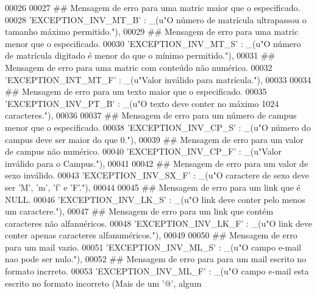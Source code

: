 \begin{DoxyCode}
00026 
00027     \textcolor{comment}{## Mensagem de erro para uma matric maior que o especificado.}
00028     \textcolor{stringliteral}{'EXCEPTION\_INV\_MT\_B'} : \_(\textcolor{stringliteral}{u"O número de matrícula ultrapassou o tamanho máximo permitido."}),
00029     \textcolor{comment}{## Mensagem de erro para uma matric menor que o especificado.}
00030     \textcolor{stringliteral}{'EXCEPTION\_INV\_MT\_S'} : \_(\textcolor{stringliteral}{u"O número de matrícula digitado é menor do que o mínimo permitido."}),
00031     \textcolor{comment}{## Mensagem de erro para uma matric com conteúdo não numérico.}
00032     \textcolor{stringliteral}{'EXCEPTION\_INT\_MT\_F'} : \_(\textcolor{stringliteral}{u"Valor inválido para matrícula."}),
00033 
00034     \textcolor{comment}{## Mensagem de erro para um texto maior que o especificado.}
00035     \textcolor{stringliteral}{'EXCEPTION\_INV\_PT\_B'} : \_(\textcolor{stringliteral}{u"O texto deve conter no máximo 1024 caracteres."}),
00036 
00037     \textcolor{comment}{## Mensagem de erro para um número de campus menor que o especificado.}
00038     \textcolor{stringliteral}{'EXCEPTION\_INV\_CP\_S'} : \_(\textcolor{stringliteral}{u"O número do campus deve ser maior do que 0."}),
00039     \textcolor{comment}{## Mensagem de erro para um valor de campus não numérico.}
00040     \textcolor{stringliteral}{'EXCEPTION\_INV\_CP\_F'} : \_(\textcolor{stringliteral}{u"Valor inválido para o Campus."}),
00041 
00042     \textcolor{comment}{## Mensagem de erro para um valor de sexo inválido.}
00043     \textcolor{stringliteral}{'EXCEPTION\_INV\_SX\_F'} : \_(\textcolor{stringliteral}{u"O caractere de sexo deve ser 'M', 'm', 'f' e 'F'."}),
00044 
00045     \textcolor{comment}{## Mensagem de erro para um link que é NULL.}
00046     \textcolor{stringliteral}{'EXCEPTION\_INV\_LK\_S'} : \_(\textcolor{stringliteral}{u"O link deve conter pelo menos um caractere."}),
00047     \textcolor{comment}{## Mensagem de erro para um link que contém caracteres não alfanuéricos.}
00048     \textcolor{stringliteral}{'EXCEPTION\_INV\_LK\_F'} : \_(\textcolor{stringliteral}{u"O link deve conter apenas caracteres alfanuméricos."}),
00049 
00050     \textcolor{comment}{## Mensagem de erro para um mail vazio.}
00051     \textcolor{stringliteral}{'EXCEPTION\_INV\_ML\_S'} : \_(\textcolor{stringliteral}{u"O campo e-mail nao pode ser nulo."}),
00052     \textcolor{comment}{## Mensagem de erro para para um mail escrito no formato incrreto.}
00053     \textcolor{stringliteral}{'EXCEPTION\_INV\_ML\_F'} : \_(\textcolor{stringliteral}{u"O campo e-mail esta escrito no formato incorreto (Mais de um '@', algum
}
\end{DoxyCode}
